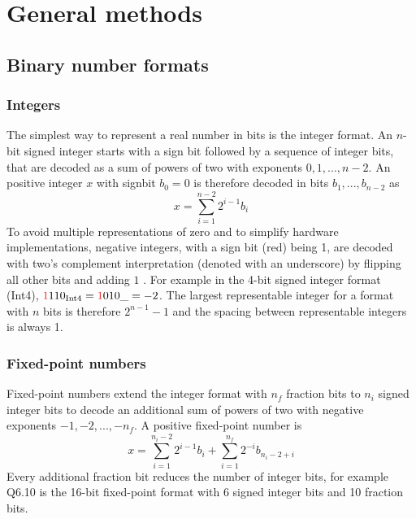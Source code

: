 \chapter{General methods}
\label{chap:methods}

\section{Binary number formats}
\label{sec:numbers}

	\subsection{Integers}
	\label{sec:integers}

The simplest way to represent a real number in bits is the integer format. An $n$-bit signed integer starts with a
sign bit followed by a sequence of integer bits, that are decoded as a sum of powers of two with exponents $0,1,...,n-2$.
An positive integer $x$ with signbit $b_0 = 0$ is therefore decoded in bits $b_1,...,b_{n-2}$ as
\begin{equation}
x = \sum_{i=1}^{n-2} 2^{i-1} b_i
\end{equation}
To avoid multiple representations of zero and to simplify hardware implementations, negative integers, with a sign bit (red) being 1,
are decoded with two's complement interpretation (denoted with an underscore) by flipping all other bits and adding $1$ \citep{Choo2003}.
For example in the 4-bit signed integer format (Int4), ${\color{psign}1}110_{\op{Int4}} = {\color{psign}1}010\_ = -2$.
The largest representable integer for a format with $n$ bits is therefore $2^{n-1}-1$ and the spacing between
representable integers is always 1.

	\subsection{Fixed-point numbers}
	\label{sec:fixpoints}

Fixed-point numbers extend the integer format with $n_f$ fraction bits to $n_i$ signed integer bits to decode an additional sum of
powers of two with negative exponents $-1,-2,...,-n_f$. A positive fixed-point number is
\begin{equation}
x = \sum_{i=1}^{n_i-2} 2^{i-1} b_i  + \sum_{i=1}^{n_f} 2^{-i} b_{n_i-2+i}
\label{eq:fixedpoint}
\end{equation}
Every additional fraction bit reduces the number of integer bits, for example Q6.10 is the 16-bit fixed-point format with
6 signed integer bits and 10 fraction bits.

